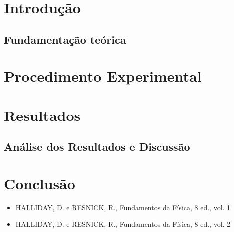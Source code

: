 \documentclass[a4paper,openany,oneside]{abntex2}
\begin{document}
\newpage



\mainmatter

\section{Introdução}


\subsection{Fundamentação teórica}


\section{Procedimento Experimental}


\section{Resultados}


\subsection{Análise dos Resultados e Discussão}


\section{Conclusão}



\begin{itemize}
    \item HALLIDAY, D. e RESNICK, R., Fundamentos da Física, 8 ed., vol. 1
    \item HALLIDAY, D. e RESNICK, R., Fundamentos da Física, 8 ed., vol. 2
\end{itemize}
\end{document}
